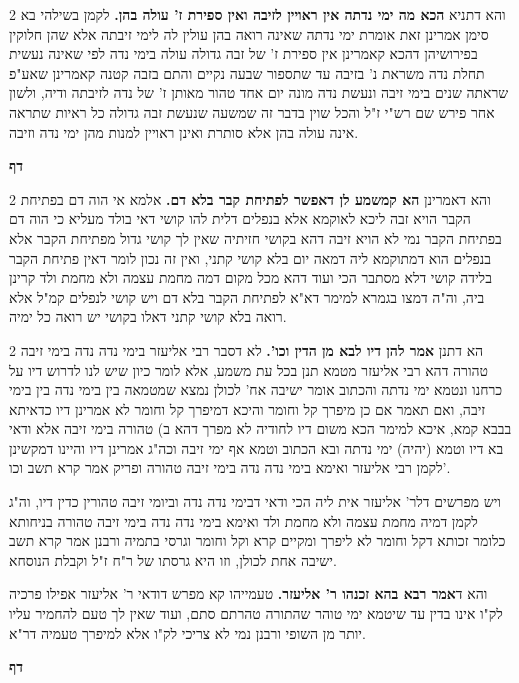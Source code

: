 \documentclass[12pt, openany]{book}
\newcommand{\sethebfont}{
\fontsize{10.5pt}{21.0pt} \selectfont
}
\newcommand{\twocol}[1]{
	{\sethebfont \begin{multicols}{2}
			#1
	\end{multicols}}	
}
\newcommand{\chapname}{}
\newcommand{\newchap}[1]{
	\addcontentsline{toc}{chapter}{#1}
	\renewcommand{\chapname}{#1}
		\begin{center}
			\textbf{%
\fontsize{16pt}{16pt}\selectfont
				#1}
		\end{center}
}
\begin{document}
\twocol{ והא דתניא \textbf{הכא מה ימי נדתה אין ראויין לזיבה ואין ספירת ז' עולה בהן.}  לקמן בשילהי בא סימן אמרינן זאת אומרת ימי נדתה שאינה רואה בהן עולין לה לימי זיבתה אלא שהן חלוקין בפירושיהן דהכא קאמרינן אין ספירת ז' של זבה גדולה עולה בימי נדה לפי שאינה נעשית תחלת נדה משראת נ' בזיבה עד שתספור שבעה נקיים והתם בזבה קטנה קאמרינן שאע"פ שראתה שנים בימי זיבה ונעשת נדה מונה יום אחד טהור מאותן ז' של נדה לזיבתה ודיה, ולשון אחר פירש שם רש"י ז"ל והכל שוין בדבר זה שמשעה שנעשת זבה גדולה כל ראיות שתראה אינה עולה בהן אלא סותרת ואינן ראויין למנות מהן ימי נדה וזיבה. 
\par}
\newchap{דף }
\twocol{והא דאמרינן \textbf{הא קמשמע לן דאפשר לפתיחת קבר בלא דם.}  אלמא אי הוה דם בפתיחת הקבר הויא זבה ליכא לאוקמא אלא בנפלים דלית להו קושי דאי בולד מעליא כי הוה דם בפתיחת הקבר נמי לא הויא זיבה דהא בקושי חזיתיה שאין לך קושי גדול מפתיחת הקבר אלא בנפלים הוא דמתוקמא ליה דמאה יום בלא קושי קתני, ואין זה נכון לומר דאין פתיחת הקבר בלידה קושי דלא מסתבר הכי ועוד דהא מכל מקום דמה מחמת עצמה ולא מחמת ולד קרינן ביה, וה"ה דמצו בגמרא למימר דא"א לפתיחת הקבר בלא דם ויש קושי לנפלים קמ"ל אלא רואה בלא קושי קתני דאלו בקושי יש רואה כל ימיה. 
\par}
\twocol{הא דתנן \textbf{אמר להן דיו לבא מן הדין וכו'.}  לא דסבר רבי אליעזר בימי נדה נדה בימי זיבה טהורה דהא רבי אליעזר מטמא תנן בכל עת משמע, אלא לומר כיון שיש לנו לדרוש דיו על כרחנו ונטמא ימי נדתה והכתוב אומר ישיבה אח' לכולן נמצא שמטמאה בין בימי נדה בין בימי זיבה, ואם תאמר אם כן מיפרך קל וחומר והיכא דמיפרך קל וחומר לא אמרינן דיו כדאיתא בבבא קמא, איכא למימר הכא משום דיו לחודיה לא מפרך דהא ב) טהורה בימי זיבה אלא ודאי בא דיו וטמא (יהיה) ימי נדתה ובא הכתוב וטמא אף ימי זיבה וכה"ג אמרינן דיו והיינו דמקשינן לקמן רבי אליעזר ואימא בימי נדה נדה בימי זיבה טהורה ופריק אמר קרא תשב וכו'.\par ויש מפרשים דלר' אליעזר אית ליה הכי ודאי דבימי נדה נדה וביומי זיבה טהורין כדין דיו, וה"ג לקמן דמיה מחמת עצמה ולא מחמת ולד ואימא בימי נדה נדה בימי זיבה טהורה בניחותא כלומר זכותא דקל וחומר לא ליפרך ומקיים קרא וקל וחומר וגרסי בתמיה ורבנן אמר קרא תשב ישיבה אחת לכולן, וזו היא גרסתו של ר"ח ז"ל וקבלת הנוסחא. 
\par והא ד\textbf{אמר רבא בהא זכנהו ר' אליעזר.}  טעמייהו קא מפרש דודאי ר' אליעזר אפילו פרכיה לק"ו אינו בדין עד שיטמא ימי טוהר שהתורה טהרתם סתם, ועוד שאין לך טעם להחמיר עליו יותר מן השופי ורבנן נמי לא צריכי לק"ו אלא למיפרך טעמיה דר"א. 
\par}
\newchap{דף }
\end{document}
